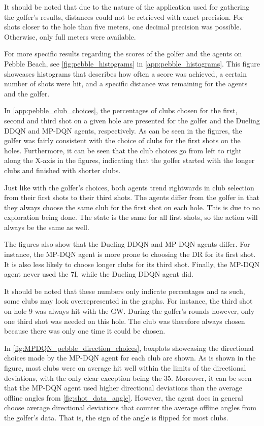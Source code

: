 \documentclass{kththesis}
\begin{document}
It should be noted that due to the nature of the application used for gathering the golfer's results, distances could not be retrieved with exact precision. For shots closer to the hole than five meters, one decimal precision was possible. Otherwise, only full meters were available.

For more specific results regarding the scores of the golfer and the agents on Pebble Beach, see \autoref{fig:pebble_histograms} in \autoref{app:pebble_histograms}. This figure showcases histograms that describes how often a score was achieved, a certain number of shots were hit, and a specific distance was remaining for the agents and the golfer.

In \autoref{app:pebble_club_choices}, the percentages of clubs chosen for the first, second and third shot on a given hole are presented for the golfer and the Dueling DDQN and MP-DQN agents, respectively. As can be seen in the figures, the golfer was fairly consistent with the choice of clubs for the first shots on the holes. Furthermore, it can be seen that the club choices go from left to right along the X-axis in the figures, indicating that the golfer started with the longer clubs and finished with shorter clubs.

Just like with the golfer's choices, both agents trend rightwards in club selection from their first shots to their third shots. The agents differ from the golfer in that they always choose the same club for the first shot on each hole. This is due to no exploration being done. The state is the same for all first shots, so the action will always be the same as well.

The figures also show that the Dueling DDQN and MP-DQN agents differ. For instance, the MP-DQN agent is more prone to choosing the DR for its first shot. It is also less likely to choose longer clubs for its third shot. Finally, the MP-DQN agent never used the 7I, while the Dueling DDQN agent did.

It should be noted that these numbers only indicate percentages and as such, some clubs may look overrepresented in the graphs. For instance, the third shot on hole 9 was always hit with the GW. During the golfer's rounds however, only one third shot was needed on this hole. The club was therefore always chosen because there was only one time it could be chosen.

In \autoref{fig:MPDQN_pebble_direction_choices}, boxplots showcasing the directional choices made by the MP-DQN agent for each club are shown. As is shown in the figure, most clubs were on average hit well within the limits of the directional deviations, with the only clear exception being the 35. Moreover, it can be seen that the MP-DQN agent used higher directional deviations than the average offline angles from \autoref{fig:shot_data_angle}. However, the agent does in general choose average directional deviations that counter the average offline angles from the golfer's data. That is, the sign of the angle is flipped for most clubs.
\end{document}
